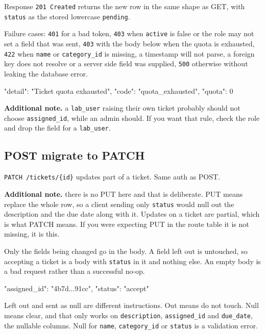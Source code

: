 \documentclass[12pt,letterpaper]{article}
\newenvironment{note}[1][Additional note]
  {\begin{notebox}\noindent\textbf{#1.}\space\ignorespaces}
  {\end{notebox}}
\begin{document}
Response \texttt{201 Created} returns the new row in the same shape as GET, with
\texttt{status} as the stored lowercase \texttt{pending}.

Failure cases: \texttt{401} for a bad token, \texttt{403} when \texttt{active}
is false or the role may not set a field that was sent, \texttt{403} with the
body below when the quota is exhausted, \texttt{422} when \texttt{name} or
\texttt{category\_id} is missing, a timestamp will not parse, a foreign key does
not resolve or a server side field was supplied, \texttt{500} otherwise without
leaking the database error.

\begin{code}
{
  "detail": "Ticket quota exhausted",
  "code": "quota_exhausted",
  "quota": 0
}
\end{code}

\begin{note}
a \texttt{lab\_user} raising their own ticket probably should not choose
\texttt{assigned\_id}, while an admin should. If you want that rule, check the
role and drop the field for a \texttt{lab\_user}.
\end{note}

\subsection{POST migrate to PATCH}

\texttt{PATCH /tickets/\{id\}} updates part of a ticket. Same auth as POST.

\begin{note}
there is no PUT here and that is deliberate. PUT means replace the whole row, so
a client sending only \texttt{status} would null out the description and the due
date along with it. Updates on a ticket are partial, which is what PATCH means.
If you were expecting PUT in the route table it is not missing, it is this.
\end{note}

Only the fields being changed go in the body. A field left out is untouched, so
accepting a ticket is a body with \texttt{status} in it and nothing else. An
empty body is a bad request rather than a successful no-op.

\begin{code}
{
  "assigned_id": "4b7d...91cc",
  "status": "accept"
}
\end{code}

Left out and sent as null are different instructions. Out means do not touch.
Null means clear, and that only works on \texttt{description},
\texttt{assigned\_id} and \texttt{due\_date}, the nullable columns. Null for
\texttt{name}, \texttt{category\_id} or \texttt{status} is a validation error.
\end{document}
